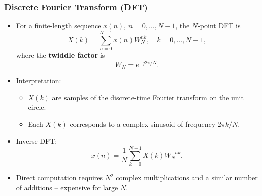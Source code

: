 \begin{frame}
	\frametitle{Discrete Fourier Transform (DFT)}
	\begin{itemize}
		\item For a finite-length sequence $x(n)$, $n = 0,\ldots,N-1$, the $N$-point DFT is
		\begin{equation}
			X(k) = \sum_{n=0}^{N-1} x(n) W_N^{nk}, \quad k = 0,\ldots,N-1,
		\end{equation}
		where the \textbf{twiddle factor} is
		\begin{equation}
			W_N = e^{-j2\pi/N}.
		\end{equation}
		\item Interpretation:
		\begin{itemize}
			\item $X(k)$ are samples of the discrete-time Fourier transform on the unit circle.
			\item Each $X(k)$ corresponds to a complex sinusoid of frequency $2\pi k/N$.
		\end{itemize}
		\item Inverse DFT:
		\begin{equation}
			x(n) = \frac{1}{N}\sum_{k=0}^{N-1} X(k) W_N^{-nk}.
		\end{equation}
		\item Direct computation requires $N^2$ complex multiplications and a similar number of additions – expensive for large $N$.
	\end{itemize}
\end{frame}

